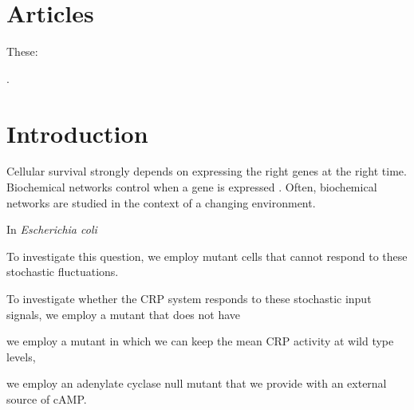 \section{Articles}

These: 

\cite{Brandman2008}
\cite{Rosenfeld2007}
\cite{Zambrano2015}
\cite{Howell2012}
\cite{Nevozhay2009}
\cite{Hornung2008}
\cite{Dublanche2006}
\cite{Becskei2000}
\cite{Swain2004}
\cite{Bowsher2013}
\cite{Avery2006}
\cite{Maheshri2007}
\cite{Levine2007a}
\cite{Bennett2008a}
\cite{Smits2006}
\cite{Balazsi2011}
\cite{Raj2008}
\cite{Davidson2008}
\cite{Elowitz2002}
\cite{Bruggeman2009}
\cite{Kitano2004a}
.



\section{Introduction}


Cellular survival strongly depends on expressing the right genes at the right time.
Biochemical networks control when a gene is expressed \cite{Bray1995, Alon2006, Alon2007, Tyson2010}.
%
Often, biochemical networks are studied in the context of a changing environment.
%







In \textit{Escherichia coli}





To investigate this question, we employ mutant cells that cannot respond to these stochastic fluctuations.
%



To investigate whether the CRP system responds to these stochastic input signals, 
we employ a mutant that does not have 

we employ a mutant in which we can keep the mean CRP activity at wild type levels,

we employ an adenylate cyclase null mutant that we provide with an external source of cAMP.
%





